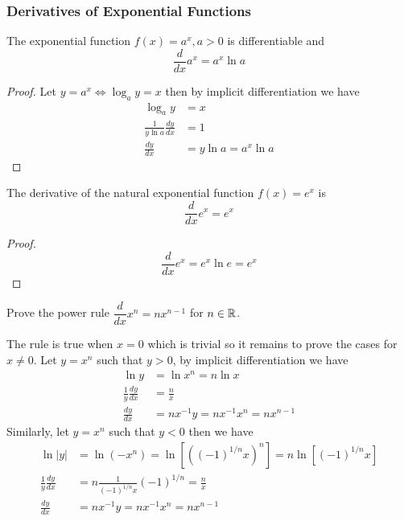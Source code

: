 \subsubsection*{Derivatives of Exponential Functions}
\begin{theorem}
    The exponential function \(f(x)=a^x,a>0\) is differentiable and
    \[\frac{d}{dx}a^x=a^x\ln a\]
\end{theorem}
\begin{proof}
    Let \(y=a^x\iff \log_a y=x\) then by implicit differentiation we have
    \begin{align*}
        \log_a y &= x \\ \frac{1}{y\ln a}\frac{dy}{dx} &= 1 \\
        \frac{dy}{dx} &= y\ln a=a^x\ln a 
    \end{align*}
\end{proof}
\begin{theorem}
    The derivative of the natural exponential function \(f(x)=e^x\) is
    \[\frac{d}{dx}e^x=e^x\]
\end{theorem}
\begin{proof}
    \[\frac{d}{dx}e^x=e^x\ln e=e^x\]
\end{proof}
\begin{problem}
    Prove the power rule \(\dfrac{d}{dx}x^n=nx^{n-1}\) for \(n\in\mathbb{R}\).
\end{problem}
\begin{solution}
    The rule is true when \(x=0\) which is trivial so it remains to prove the
    cases for \(x\neq 0\).
    Let \(y=x^n\) such that \(y>0\), by implicit differentiation we have
    \begin{align*}
        \ln y &= \ln x^n=n\ln x \\ \frac{1}{y}\frac{dy}{dx} &= \frac{n}{x} \\
        \frac{dy}{dx} &= nx^{-1}y=nx^{-1}x^n=nx^{n-1}
    \end{align*}
    Similarly, let \(y=x^n\) such that \(y<0\) then we have
    \begin{align*}
        \ln|y| &= \ln(-x^n)=\ln[((-1)^{1/n}x)^n]=n\ln[(-1)^{1/n}x] \\
        \frac{1}{y}\frac{dy}{dx} &= n\frac{1}{(-1)^{1/n}x}(-1)^{1/n}
        =\frac{n}{x} \\ \frac{dy}{dx} &= nx^{-1}y=nx^{-1}x^n=nx^{n-1} 
    \end{align*}
\end{solution}

